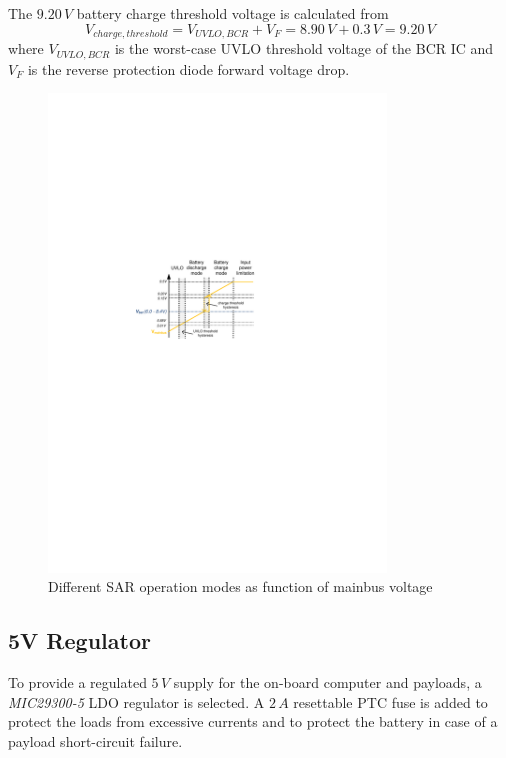 The $9.20\,V$ battery charge threshold voltage is calculated from
%
\begin{equation}
V_{charge,threshold}=V_{UVLO,BCR}+V_F=8.90\,V+0.3\,V= 9.20\,V
\end{equation}
%
where $V_{UVLO,BCR}$ is the worst-case \ac{UVLO} threshold voltage of the \ac{BCR} \ac{IC} and $V_F$ is the reverse protection diode forward voltage drop.
%
%
\begin{figure}[H]
\centering
\includegraphics[width=0.8\textwidth]{figures/fig_CDR_SAR_ModeTransition}
\caption{Different \ac{SAR} operation modes as function of mainbus voltage}
\label{fig:SAR_ModeTransition}
\end{figure}%
%
%
\subsection{5V Regulator}
To provide a regulated $5\,V$ supply for the on-board computer and payloads, a \textit{MIC29300-5} \ac{LDO} regulator is selected. A $2\,A$ resettable \ac{PTC} fuse is added to protect the loads from excessive currents and to protect the battery in case of a payload short-circuit failure.
%
